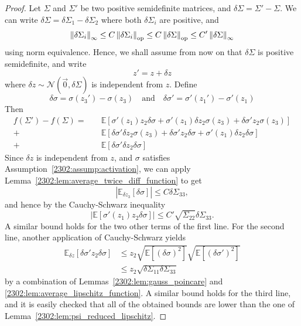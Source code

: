 \begin{proof}
    Let $\Sigma$ and $\Sigma'$ be two positive semidefinite matrices, and $\delta\Sigma = \Sigma' - \Sigma$. We can write $\delta\Sigma = \delta\Sigma_1 - \delta\Sigma_2$ where both $\delta\Sigma_i$ are positive, and
    \[ \left\lVert \delta\Sigma_i\right\rVert_{\infty} \leq C\left\lVert \delta\Sigma_i\right\rVert_{\mathrm{op}} \leq  C\left\lVert \delta\Sigma\right\rVert_{\mathrm{op}} \leq C'\left\lVert \delta\Sigma\right\rVert_{\infty} \]
    using norm equivalence. Hence, we shall assume from now on that $\delta\Sigma$ is positive semidefinite, and write
    \[z' = z + \delta z\]
    where $\delta z \sim \mathcal N(\vec{0}, \delta\Sigma)$ is independent from $z$. Define
    \[ \delta\sigma = \sigma(z_3') - \sigma(z_3) \quad \text{and} \quad \delta\sigma' = \sigma'(z_1') - \sigma'(z_1) \]
    Then
    \begin{align*}
        f(\Sigma') - f(\Sigma) = \quad&\mathbb{E}\left[ \sigma'(z_1)z_2\delta\sigma + \sigma'(z_1)\delta z_2 \sigma(z_3) + \delta \sigma' z_2\sigma(z_3) \right] \\
        + \ &\mathbb{E}\left[ \delta\sigma'\delta z_2 \sigma(z_3) + \delta\sigma' z_2 \delta\sigma + \sigma'(z_1)\delta z_2 \delta \sigma \right] \\
        + \ & \mathbb{E}[\delta\sigma' \delta z_2 \delta \sigma]
    \end{align*}
    Since $\delta z$ is independent from $z$, and $\sigma$ satisfies Assumption~\ref{2302:assump:activation}, we can apply Lemma~\ref{2302:lem:average_twice_diff_function} to get
    \[ |\mathbb{E}_{\delta z_3}[\delta\sigma]| \leq C\delta\Sigma_{33}, \]
    and hence by the Cauchy-Schwarz inequality
    \[ \left|\mathbb{E}\left[ \sigma'(z_1)z_2\delta\sigma \right]\right| \leq C' \sqrt{\Sigma_{22}}  \delta\Sigma_{33}.  \]
    A similar bound holds for the two other terms of the first line. For the second line, another application of Cauchy-Schwarz yields
    \begin{align*}
        \mathbb{E}_{\delta z}\left[\delta\sigma' z_2 \delta\sigma\right] &\leq z_2 \sqrt{\mathbb{E}[(\delta\sigma)^2]}\sqrt{\mathbb{E}[(\delta\sigma')^2]} \\
        &\leq z_2 \sqrt{\delta\Sigma_{11}\delta\Sigma_{33}}
    \end{align*}
    by a combination of Lemmas~\ref{2302:lem:gauss_poincare} and \ref{2302:lem:average_lipschitz_function}. A similar bound holds for the third line, and it is easily checked that all of the obtained bounds are lower than the one of Lemma~\ref{2302:lem:psi_reduced_lipschitz}.
\end{proof}

